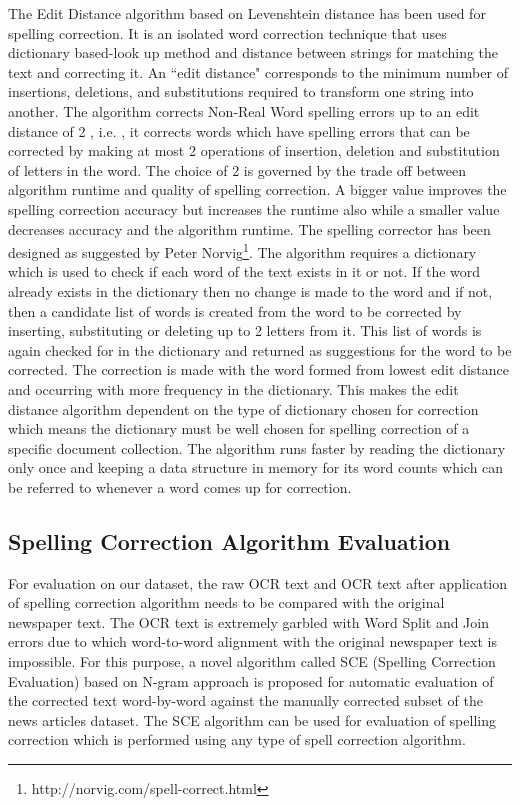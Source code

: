 \documentclass[12pt]{article}
\begin{document}
The Edit Distance algorithm based on Levenshtein distance\cite{levenshtein1966binary} has been used for spelling correction. It is an isolated word correction technique that uses dictionary based-look up method and distance between strings for matching the text and correcting it. An ``edit distance" corresponds to the minimum number of insertions, deletions, and substitutions required to transform one string into another. The algorithm corrects Non-Real Word spelling errors up to an edit distance of 2 , i.e. , it corrects words which have spelling errors that can be corrected by making at most 2 operations of insertion, deletion and substitution of letters in the word. The choice of 2 is governed by the trade off between algorithm runtime and quality of spelling correction. A bigger value improves the spelling correction accuracy but increases the runtime also while a smaller value decreases accuracy and the algorithm runtime.
The spelling corrector has been designed as suggested by Peter Norvig\footnote{ http://norvig.com/spell-correct.html}. The algorithm requires a dictionary which is used to check if each word of the text exists in it or not. If the word already exists in the dictionary then no change is made to the word and if not, then a candidate list of words is created from the word to be corrected by inserting, substituting or deleting up to 2 letters from it.  This list of words is again checked for in the dictionary and returned as suggestions for the word to be corrected. The correction is made with the word formed from lowest edit distance and occurring with more frequency in the dictionary. This makes the edit distance algorithm dependent on the type of dictionary chosen for correction which means the dictionary must be well chosen for spelling correction of a specific document collection. The algorithm runs faster by reading the dictionary only once and keeping a data structure in memory for its word counts which can be referred to whenever a word comes up for correction.

\subsection{Spelling Correction Algorithm Evaluation}
\label{spell:sce}

For evaluation on our dataset, the raw OCR text and OCR text after application of spelling correction algorithm needs to be compared with the original newspaper text. The OCR text is extremely garbled with Word Split and Join errors due to which word-to-word alignment with the original newspaper text is impossible. For this purpose, a novel algorithm called SCE (Spelling Correction Evaluation) based on N-gram approach is proposed for automatic evaluation of the corrected text word-by-word against the manually corrected subset of the news articles dataset. The SCE algorithm can be used for evaluation of spelling correction which is performed using any type of spell correction algorithm.
\end{document}
